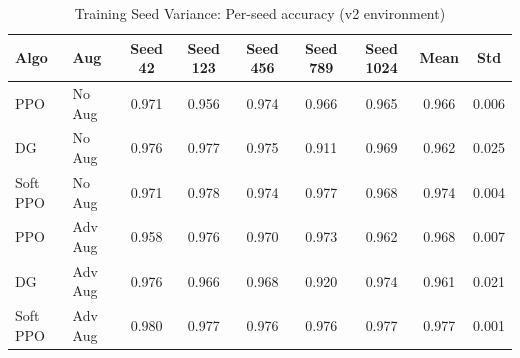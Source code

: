 \begin{table}[h]
\centering
\caption{Training Seed Variance: Per-seed accuracy (v2 environment)}
\label{tab:seed_variance}
\begin{tabular}{llccccccc}
\toprule
Algo & Aug & Seed 42 & Seed 123 & Seed 456 & Seed 789 & Seed 1024 & Mean & Std \\
\midrule
  PPO & No Aug & 0.971 & 0.956 & 0.974 & 0.966 & 0.965 & 0.966 & 0.006 \\
  DG & No Aug & 0.976 & 0.977 & 0.975 & 0.911 & 0.969 & 0.962 & 0.025 \\
  Soft PPO & No Aug & 0.971 & 0.978 & 0.974 & 0.977 & 0.968 & 0.974 & 0.004 \\
\midrule
  PPO & Adv Aug & 0.958 & 0.976 & 0.970 & 0.973 & 0.962 & 0.968 & 0.007 \\
  DG & Adv Aug & 0.976 & 0.966 & 0.968 & 0.920 & 0.974 & 0.961 & 0.021 \\
  Soft PPO & Adv Aug & 0.980 & 0.977 & 0.976 & 0.976 & 0.977 & 0.977 & 0.001 \\
\midrule
\bottomrule
\end{tabular}
\end{table}